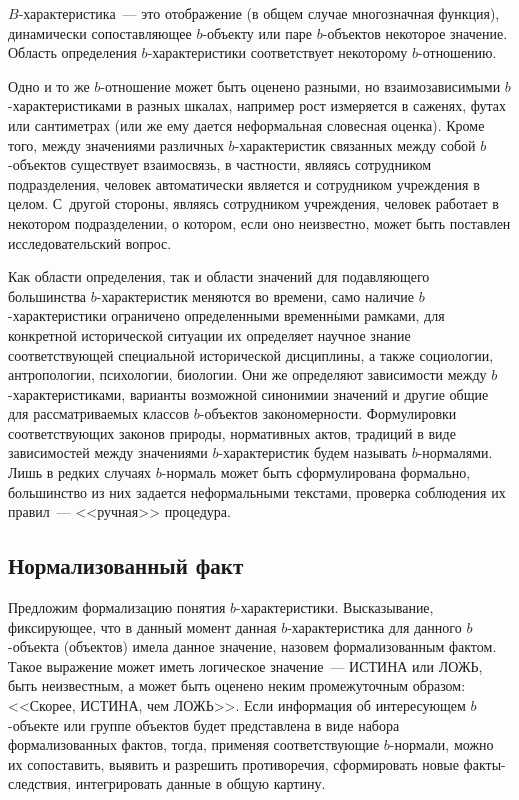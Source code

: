 \begin{multicols}{2}
  $B$-характеристика~--- это отображение (в общем случае многозначная 
функция), динамически сопоставляющее $b$-объек\-ту или паре $b$-объек\-тов 
некоторое значение. Область определения $b$-ха\-рак\-те\-рис\-ти\-ки соответствует 
некоторому $b$-от\-но\-шению.
  
  Одно и то же $b$-отношение может быть оценено разными, но 
взаимозависимыми $b$-ха\-рак\-те\-ри\-сти\-ка\-ми в разных шкалах, например рост 
измеряется в саженях, футах или сантиметрах (или же ему дается неформальная 
словесная оценка). Кроме того, между значениями различных 
  $b$-ха\-рак\-те\-ристик связанных между собой $b$-объек\-тов существует 
взаимосвязь, в частности, являясь сотрудником подразделения, человек 
автоматически является и сотрудником учреждения в целом. С~другой 
стороны, являясь сотрудником учреждения, человек работает в некотором 
подразделении, о котором, если оно неизвестно, может быть поставлен 
исследовательский вопрос.
  
  Как области определения, так и области значений для подавляющего 
большинства $b$-ха\-рак\-те\-ри\-стик меняются во времени, само наличие 
  $b$-ха\-рак\-те\-ри\-сти\-ки ограничено определенными временн$\acute{\mbox{ы}}$ми рамками, для 
конкретной исторической ситуации их определяет научное знание 
соответствующей специальной исторической дис\-цип\-ли\-ны, а также социологии, 
антропологии, психологии, биологии. Они же определяют зависимости между 
$b$-ха\-рак\-те\-ри\-сти\-ка\-ми, варианты возможной синонимии значений и другие 
общие для рассматриваемых классов $b$-объек\-тов закономерности. 
Формулировки соответствующих законов природы, нормативных актов, 
традиций в виде зависимостей между значениями $b$-ха\-рак\-те\-ри\-стик будем 
называть $b$-нор\-ма\-ля\-ми. Лишь в редких случаях $b$-нор\-маль может быть 
сформулирована формально, большинство из них задается неформальными 
текстами, проверка соблюдения их правил~--- <<ручная>> процедура. 

\subsection{Нормализованный факт}
 
  Предложим формализацию понятия $b$-ха\-рак\-те\-ри\-сти\-ки. Высказывание, 
фиксирующее, что в данный момент данная $b$-характеристика для данного 
  $b$-объекта (объектов) имела данное значение, назовем формализованным 
фактом. Такое выражение может иметь логическое значение~--- ИСТИНА или 
ЛОЖЬ, быть неизвестным, а может быть оценено неким промежуточным 
образом: <<Скорее, ИСТИНА, чем ЛОЖЬ>>. Если информация об 
интересующем $b$-объекте или группе объектов будет представлена в виде 
набора формализованных фактов, тогда, применяя соответствующие 
  $b$-нормали, можно их сопоставить, выявить и разрешить противоречия, 
сформировать новые факты-следствия, интегрировать данные в общую 
картину.
  

\end{multicols}
